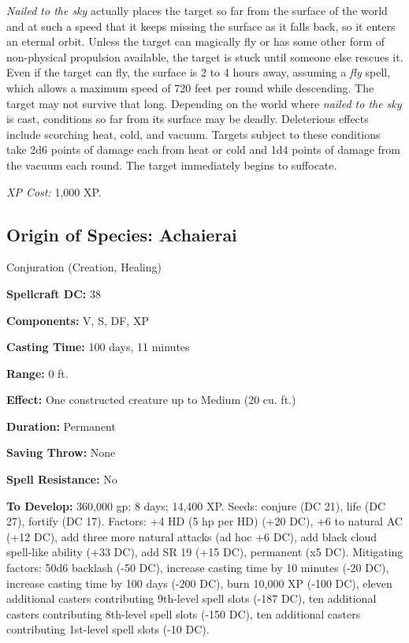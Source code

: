 \documentclass{article}
\begin{document}
\textit{Nailed to the sky }actually places the target so far from the surface of 
the world and at such a speed that it keeps missing the surface as it falls back, 
so it enters an eternal orbit. Unless the target can magically fly or has some 
other form of non-physical propulsion available, the target is stuck until someone 
else rescues it. Even if the target can fly, the surface is 2 to 4 hours away, 
assuming a \textit{fly }spell, which allows a maximum speed of 720 feet per round 
while descending. The target may not survive that long. Depending on the world 
where \textit{nailed to the sky }is cast, conditions so far from its surface may 
be deadly. Deleterious effects include scorching heat, cold, and vacuum. Targets 
subject to these conditions take 2d6 points of damage each from heat or cold and 
1d4 points of damage from the vacuum each round. The target immediately begins 
to suffocate. 

\textit{XP Cost: }1,000 XP. 

\vspace{12pt}
\subsection*{Origin of Species: Achaierai }

Conjuration (Creation, Healing)

\textbf{Spellcraft DC:} 38 

\textbf{Components:} V, S, DF, XP 

\textbf{Casting Time:} 100 days, 11 minutes 

\textbf{Range:} 0 ft. 

\textbf{Effect:} One constructed creature up to Medium (20 cu. ft.) 

\textbf{Duration:} Permanent 

\textbf{Saving Throw:} None 

\textbf{Spell Resistance:} No 

\textbf{To Develop:} 360,000 gp; 8 days; 14,400 XP. Seeds: conjure (DC 21), life 
(DC 27), fortify (DC 17). Factors: +4 HD (5 hp per HD) (+20 DC), +6 to natural 
AC (+12 DC), add three more natural attacks (ad hoc +6 DC), add black cloud spell-like 
ability (+33 DC), add SR 19 (+15 DC), permanent (x5 DC). Mitigating factors: 50d6 
backlash (-50 DC), increase casting time by 10 minutes (-20 DC), increase casting 
time by 100 days (-200 DC), burn 10,000 XP (-100 DC), eleven additional casters 
contributing 9th-level spell slots (-187 DC), ten additional casters contributing 
8th-level spell slots (-150 DC), ten additional casters contributing 1st-level 
spell slots (-10 DC).
\end{document}
